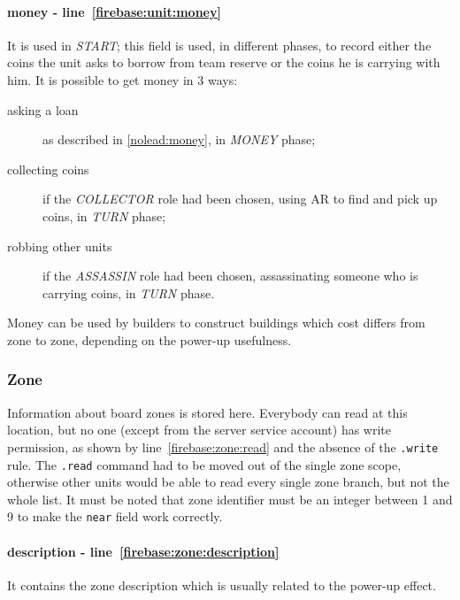 				\paragraph{money - line~\ref{firebase:unit:money}}
				It is used in \emph{START}; this field is used, in different phases, to record either the coins the unit asks to borrow from team reserve or the coins he is carrying with him. It is possible to get money in 3 ways:
				\begin{description}
					\item[asking a loan] as described in \autoref{nolead:money}, in \emph{MONEY} phase;
					\item[collecting coins] if the \emph{COLLECTOR} role had been chosen, using AR to find and pick up coins, in \emph{TURN} phase;
					\item[robbing other units] if the \emph{ASSASSIN} role had been chosen, assassinating someone who is carrying coins, in \emph{TURN} phase.
				\end{description}
			
				Money can be used by builders to construct buildings which cost differs from zone to zone, depending on the power-up usefulness.
			
			\subsubsection{Zone}
			
				
								
				Information about board zones is stored here.
				Everybody can read at this location, but no one (except from the server service account) has write permission, as shown by line~\ref{firebase:zone:read} and the absence of the \lstinline|.write| rule.
				The \lstinline|.read| command had to be moved out of the single zone scope, otherwise other units would be able to read every single zone branch, but not the whole list.
				It must be noted that zone identifier must be an integer between 1 and 9 to make the \lstinline|near| field work correctly. \\
				
				\paragraph{description - line~\ref{firebase:zone:description}}
				It contains the zone description which is usually related to the power-up effect.
				
